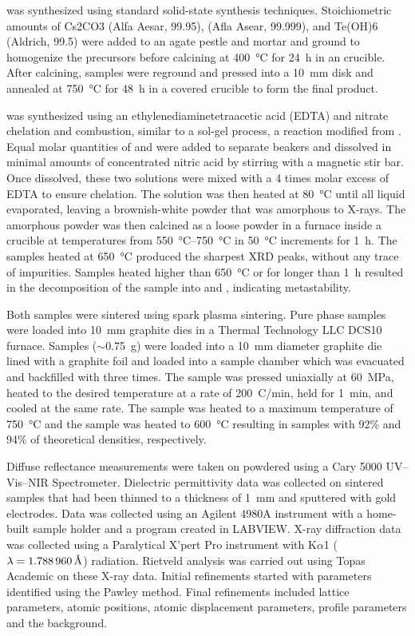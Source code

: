 \documentclass{article}
\newcommand{\CsTaTeO}[1][]{\ch{CsTaTeO6#1}}
\newcommand{\BiZrO}[1][]{\ch{Bi2Zr2O7#1}}
\newcommand{\A}{\protect\text{Å}} %
\begin{document}
\CsTaTeO{} was synthesized using standard solid-state synthesis techniques. Stoichiometric amounts of Cs2CO3 (Alfa Aesar, 99.95),  (Afla Asear, 99.999), and Te(OH)6 (Aldrich, 99.5) were added to an agate pestle and mortar and ground to homogenize the precursors before calcining at \SI{400}{\celsius} for \SI{24}{h} in an  crucible. After calcining, samples were reground and pressed into a \SI{10}{mm} disk and annealed at \SI{750}{\celsius} for \SI{48}{h} in a covered  crucible to form the final product.

\BiZrO{} was synthesized using an ethylenediaminetetraacetic acid (EDTA) and nitrate chelation and combustion, similar to a sol-gel process, a reaction modified from \cite{pandey_metastable_2018}. Equal molar quantities of  and  were added to separate beakers and dissolved in minimal amounts of concentrated nitric acid by stirring with a magnetic stir bar. Once dissolved, these two solutions were mixed with a 4 times molar excess of EDTA to ensure chelation. The solution was then heated at \SI{80}{\celsius} until all liquid evaporated, leaving a brownish-white powder that was amorphous to X-rays. The amorphous powder was then calcined as a loose powder in a furnace inside a  crucible at temperatures from \SIrange{550}{750}{\celsius} in \SI{50}{\celsius} increments for \SI{1}{h}. The samples heated at \SI{650}{\celsius} produced the sharpest XRD peaks, without any trace of impurities. Samples heated higher than \SI{650}{\celsius} or for longer than \SI{1}{h} resulted in the decomposition of the sample into  and , indicating metastability.

Both samples were sintered using spark plasma sintering. Pure phase samples were loaded into \SI{10}{mm} graphite dies in a Thermal Technology LLC DCS10 furnace. Samples ($\sim$\SI{0.75}{g}) were loaded into a \SI{10}{mm} diameter graphite die lined with a graphite foil and loaded into a sample chamber which was evacuated and backfilled with  three times. The sample was pressed uniaxially at \SI{60}{MPa}, heated to the desired temperature at a rate of \SI{200}{C/min}, held for \SI{1}{min}, and cooled at the same rate. The \CsTaTeO{} sample was heated to a maximum temperature of \SI{750}{\celsius} and the \BiZrO{} sample was heated to \SI{600}{\celsius} resulting in samples with 92\% and 94\% of theoretical densities, respectively.

Diffuse reflectance measurements were taken on powdered using a Cary 5000 UV–Vis–NIR Spectrometer. Dielectric permittivity data was collected on sintered samples that had been thinned to a thickness of \SI{1}{mm} and sputtered with gold electrodes. Data was collected using an Agilent 4980A instrument with a home-built sample holder and a program created in LABVIEW. X-ray diffraction data was collected using a Paralytical X'pert Pro instrument with  K$\alpha$1 ($\lambda = \SI{1.788960}{\A}$) radiation. Rietveld analysis was carried out using Topas Academic on these X-ray data. Initial refinements started with parameters identified using the Pawley method. Final refinements included lattice parameters, atomic positions, atomic displacement parameters, profile parameters and the background.
\end{document}
